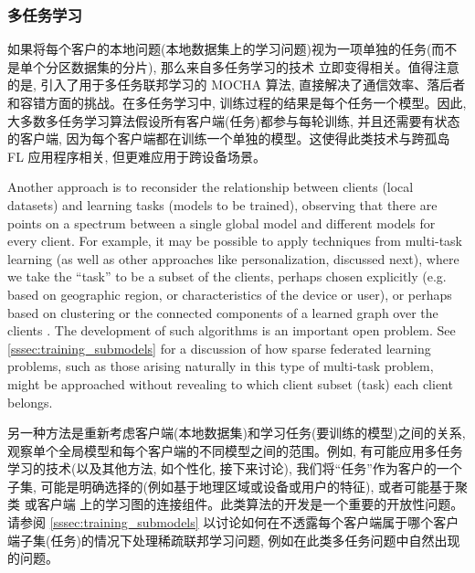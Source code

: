 \subsubsection*{多任务学习}
如果将每个客户的本地问题(本地数据集上的学习问题)视为一项单独的任务(而不是单个分区数据集的分片), 那么来自多任务学习的技术 \citep{DBLP:journals/corr/ZhangY17aa} 立即变得相关。值得注意的是, \citet{Smith2017} 引入了用于多任务联邦学习的 MOCHA 算法, 直接解决了通信效率、落后者和容错方面的挑战。在多任务学习中, 训练过程的结果是每个任务一个模型。因此, 大多数多任务学习算法假设所有客户端(任务)都参与每轮训练, 并且还需要有状态的客户端, 因为每个客户端都在训练一个单独的模型。这使得此类技术与跨孤岛 FL 应用程序相关, 但更难应用于跨设备场景。


Another approach is to reconsider the relationship between clients (local datasets) and learning tasks (models to be trained), observing that there are points on a spectrum between a single global model and different models for every client. For example, it may be possible to apply techniques from multi-task learning (as well as other approaches like personalization, discussed next), where we take the ``task'' to be a subset of the clients, perhaps chosen explicitly (e.g. based on geographic region, or characteristics of the device or user), or perhaps based on clustering \citep{mansour2020three} or the connected components of a learned graph over the clients \citep{Zantedeschi2019}. The development of such algorithms is an important open problem.  See \cref{sssec:training_submodels} for a discussion of how sparse federated learning problems, such as those arising naturally in this type of multi-task problem, might be approached without revealing to which client subset (task) each client belongs.

另一种方法是重新考虑客户端(本地数据集)和学习任务(要训练的模型)之间的关系, 观察单个全局模型和每个客户端的不同模型之间的范围。例如, 有可能应用多任务学习的技术(以及其他方法, 如个性化, 接下来讨论), 我们将“任务”作为客户的一个子集, 可能是明确选择的(例如基于地理区域或设备或用户的特征), 或者可能基于聚类 \citep{mansour2020three} 或客户端 \citep{Zantedeschi2019} 上的学习图的连接组件。此类算法的开发是一个重要的开放性问题。请参阅 \cref{sssec:training_submodels} 以讨论如何在不透露每个客户端属于哪个客户端子集(任务)的情况下处理稀疏联邦学习问题, 例如在此类多任务问题中自然出现的问题。




